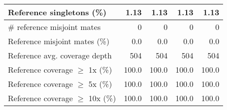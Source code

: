 \documentclass[12pt,a4paper]{article}
\begin{document}
\begin{table}[ht]
\begin{center}
\begin{tabular}{|l*{4}{|r}|}
Reference singletons (\%) & 1.13 & 1.13 & 1.13 & 1.13 \\ \hline
\# reference misjoint mates & 0 & 0 & 0 & 0 \\ \hline
Reference misjoint mates (\%) & 0.0 & 0.0 & 0.0 & 0.0 \\ \hline
Reference avg. coverage depth & 504 & 504 & 504 & 504 \\ \hline
Reference coverage $\geq$ 1x (\%) & 100.0 & 100.0 & 100.0 & 100.0 \\ \hline
Reference coverage $\geq$ 5x (\%) & 100.0 & 100.0 & 100.0 & 100.0 \\ \hline
Reference coverage $\geq$ 10x (\%) & 100.0 & 100.0 & 100.0 & 100.0 \\ \hline
\end{tabular}
\end{center}
\end{table}
\end{document}
